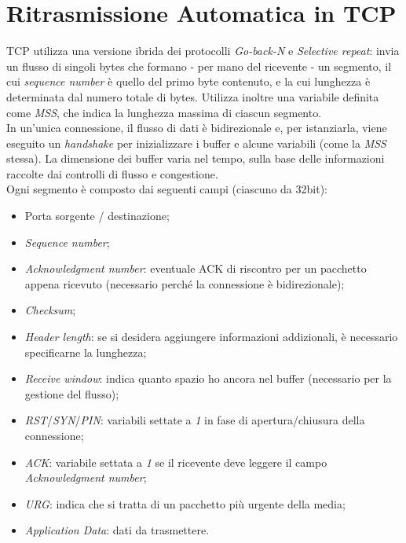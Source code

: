 \section{Ritrasmissione Automatica in TCP}
TCP utilizza una versione ibrida dei protocolli \textit{Go-back-N} e \textit{Selective repeat}: invia un flusso di singoli bytes che formano - per mano del ricevente - un segmento, il cui \textit{sequence number} è quello del primo byte contenuto, e la cui lunghezza è determinata dal numero totale di bytes. Utilizza inoltre una variabile definita come \textit{MSS}, che indica la lunghezza massima di ciascun segmento. \\
In un'unica connessione, il flusso di dati è bidirezionale e, per istanziarla, viene eseguito un \textit{handshake} per inizializzare i buffer e alcune variabili (come la \textit{MSS} stessa). La dimensione dei buffer varia nel tempo, sulla base delle informazioni raccolte dai controlli di flusso e congestione. \\
Ogni segmento è composto dai seguenti campi (ciascuno da 32bit):
\begin{itemize}
	\item Porta sorgente / destinazione;
	\item \textit{Sequence number};
	\item \textit{Acknowledgment number}: eventuale ACK di riscontro per un pacchetto appena ricevuto (necessario perché la connessione è bidirezionale);
	\item \textit{Checksum};
	\item \textit{Header length}: se si desidera aggiungere informazioni addizionali, è necessario specificarne la lunghezza;
	\item \textit{Receive window}: indica quanto spazio ho ancora nel buffer (necessario per la gestione del flusso);
	\item \textit{RST}/\textit{SYN}/\textit{PIN}: variabili settate a \textit{1} in fase di apertura/chiusura della connessione;
	\item \textit{ACK}: variabile settata a \textit{1} se il ricevente deve leggere il campo \textit{Acknowledgment number};
	\item \textit{URG}: indica che si tratta di un pacchetto più urgente della media;
	\item \textit{Application Data}: dati da trasmettere.
\end{itemize}


